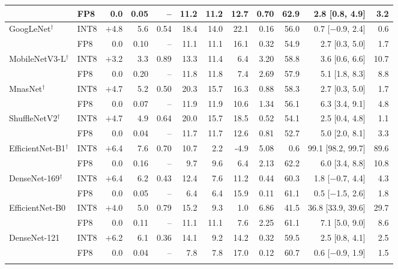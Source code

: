 \begin{table}
\begin{tabular}{@{}llrrrrrrrrrr@{}}
 & FP8 & 0.0 & 0.05 & -- & 11.2 & 11.2 & 12.7 & 0.70 & 62.9 & 2.8 [0.8, 4.9] & 3.2 \\
\midrule
GoogLeNet$^\dagger$ & INT8 & $+$4.8 & 5.6 & 0.54 & 18.4 & 14.0 & 22.1 & 0.16 & 56.0 & 0.7 [$-$0.9, 2.4] & 0.6 \\
 & FP8 & 0.0 & 0.10 & -- & 11.1 & 11.1 & 16.1 & 0.32 & 54.9 & 2.7 [0.3, 5.0] & 1.7 \\
\midrule
MobileNetV3-L$^\dagger$ & INT8 & $+$3.2 & 3.3 & 0.89 & 13.3 & 11.4 & 6.4 & 3.20 & 58.8 & 3.6 [0.6, 6.6] & 10.7 \\
 & FP8 & 0.0 & 0.20 & -- & 11.8 & 11.8 & 7.4 & 2.69 & 57.9 & 5.1 [1.8, 8.3] & 8.8 \\
\midrule
MnasNet$^\dagger$ & INT8 & $+$4.7 & 5.2 & 0.50 & 20.3 & 15.7 & 16.3 & 0.88 & 58.3 & 2.7 [0.3, 5.0] & 1.7 \\
 & FP8 & 0.0 & 0.07 & -- & 11.9 & 11.9 & 10.6 & 1.34 & 56.1 & 6.3 [3.4, 9.1] & 4.8 \\
\midrule
ShuffleNetV2$^\dagger$ & INT8 & $+$4.7 & 4.9 & 0.64 & 20.0 & 15.7 & 18.5 & 0.52 & 54.1 & 2.5 [0.4, 4.8] & 1.1 \\
 & FP8 & 0.0 & 0.04 & -- & 11.7 & 11.7 & 12.6 & 0.81 & 52.7 & 5.0 [2.0, 8.1] & 3.3 \\
\midrule
EfficientNet-B1$^\dagger$ & INT8 & $+$6.4 & 7.6 & 0.70 & 10.7 & 2.2 & -4.9 & 5.08 & 0.6 & 99.1 [98.2, 99.7] & 89.6 \\
 & FP8 & 0.0 & 0.16 & -- & 9.7 & 9.6 & 6.4 & 2.13 & 62.2 & 6.0 [3.4, 8.8] & 10.8 \\
\midrule
DenseNet-169$^\dagger$ & INT8 & $+$6.4 & 6.2 & 0.43 & 12.4 & 7.6 & 11.2 & 0.44 & 60.3 & 1.8 [$-$0.7, 4.4] & 4.3 \\
 & FP8 & 0.0 & 0.05 & -- & 6.4 & 6.4 & 15.9 & 0.11 & 61.1 & 0.5 [$-$1.5, 2.6] & 1.8 \\
\midrule
EfficientNet-B0 & INT8 & $+$4.0 & 5.0 & 0.79 & 15.2 & 9.3 & 1.0 & 6.86 & 41.5 & 36.8 [33.9, 39.6] & 29.7 \\
 & FP8 & 0.0 & 0.11 & -- & 11.1 & 11.1 & 7.6 & 2.25 & 61.1 & 7.1 [5.0, 9.0] & 8.6 \\
\midrule
DenseNet-121 & INT8 & $+$6.2 & 6.1 & 0.36 & 14.1 & 9.2 & 14.2 & 0.32 & 59.5 & 2.5 [0.8, 4.1] & 2.5 \\
 & FP8 & 0.0 & 0.04 & -- & 7.8 & 7.8 & 17.0 & 0.12 & 60.7 & 0.6 [$-$0.9, 1.9] & 1.5 \\
\botrule
\end{tabular}

\end{table}
